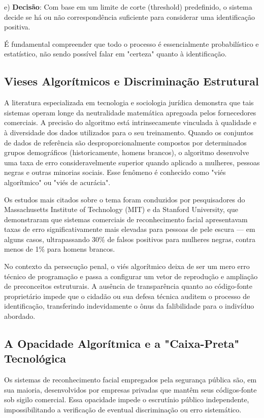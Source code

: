 \documentclass[12pt,a4paper]{article}
\begin{document}
e) \textbf{Decisão}: Com base em um limite de corte (threshold) predefinido, o sistema decide se há ou não correspondência suficiente para considerar uma identificação positiva.

É fundamental compreender que todo o processo é essencialmente probabilístico e estatístico, não sendo possível falar em "certeza" quanto à identificação.

\subsection{Vieses Algorítmicos e Discriminação Estrutural}

A literatura especializada em tecnologia e sociologia jurídica demonstra que tais sistemas operam longe da neutralidade matemática apregoada pelos fornecedores comerciais. A precisão do algoritmo está intrinsecamente vinculada à qualidade e à diversidade dos dados utilizados para o seu treinamento. Quando os conjuntos de dados de referência são desproporcionalmente compostos por determinados grupos demográficos (historicamente, homens brancos), o algoritmo desenvolve uma taxa de erro consideravelmente superior quando aplicado a mulheres, pessoas negras e outras minorias sociais. Esse fenômeno é conhecido como "viés algorítmico" ou "viés de acurácia".

Os estudos mais citados sobre o tema foram conduzidos por pesquisadores do Massachusetts Institute of Technology (MIT) e da Stanford University, que demonstraram que sistemas comerciais de reconhecimento facial apresentavam taxas de erro significativamente mais elevadas para pessoas de pele escura --- em alguns casos, ultrapassando 30\% de falsos positivos para mulheres negras, contra menos de 1\% para homens brancos.

No contexto da persecução penal, o viés algorítmico deixa de ser um mero erro técnico de programação e passa a configurar um vetor de reprodução e ampliação de preconceitos estruturais. A ausência de transparência quanto ao código-fonte proprietário impede que o cidadão ou sua defesa técnica auditem o processo de identificação, transferindo indevidamente o ônus da falibilidade para o indivíduo abordado.

\subsection{A Opacidade Algorítmica e a "Caixa-Preta" Tecnológica}

Os sistemas de reconhecimento facial empregados pela segurança pública são, em sua maioria, desenvolvidos por empresas privadas que mantêm seus códigos-fonte sob sigilo comercial. Essa opacidade impede o escrutínio público independente, impossibilitando a verificação de eventual discriminação ou erro sistemático.
\end{document}
